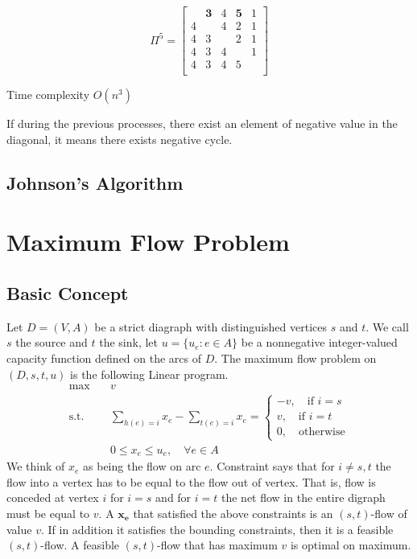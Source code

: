 			\begin{equation}
				\Pi^5 = \begin{bmatrix}
					& \mathbf{3} & 4 & \mathbf{5} & 1 \\
					4 & & 4 & 2 & 1\\
					4 & 3 & & 2 & 1 \\
					4 & 3 & 4 & & 1\\
					4 & 3 & 4 & 5 & \\
				\end{bmatrix}
			\end{equation}

			Time complexity $O(n^3)$

			If during the previous processes, there exist an element of negative value in the diagonal, it means there exists negative cycle.

		\section{Johnson's Algorithm}

	\chapter{Maximum Flow Problem}
		\section{Basic Concept}
			Let $D=(V, A)$ be a strict diagraph with distinguished vertices $s$ and $t$. We call $s$ the source and $t$ the sink, let $u=\{u_e: e\in A\}$ be a nonnegative integer-valued capacity function defined on the arcs of $D$. The maximum flow problem on $(D, s, t, u)$ is the following Linear program.
			\begin{align}
				\max \quad & v\\
				\text{s.t.} \quad & \sum_{h(e)=i}x_e - \sum_{t(e) = i} x_e = \begin{cases}
					-v, \quad \text{if } i = s\\
					v, \quad \text{if } i = t \\
					0, \quad \text{otherwise}
				\end{cases}\\
				& 0\le x_e \le u_e, \quad \forall e\in A
			\end{align}
			We think of $x_e$ as being the flow on arc $e$. Constraint says that for $i \neq s, t$ the flow into a vertex has to be equal to the flow out of vertex. That is, flow is conceded at vertex $i$ for $i=s$ and for $i=t$ the net flow in the entire digraph must be equal to $v$.
			A $\mathbf{x_e}$ that satisfied the above constraints is an $(s,t)$-flow of value $v$. If in addition it satisfies the bounding constraints, then it is a feasible $(s,t)$-flow.
			A feasible $(s,t)$-flow that has maximum $v$ is optimal on maximum.

